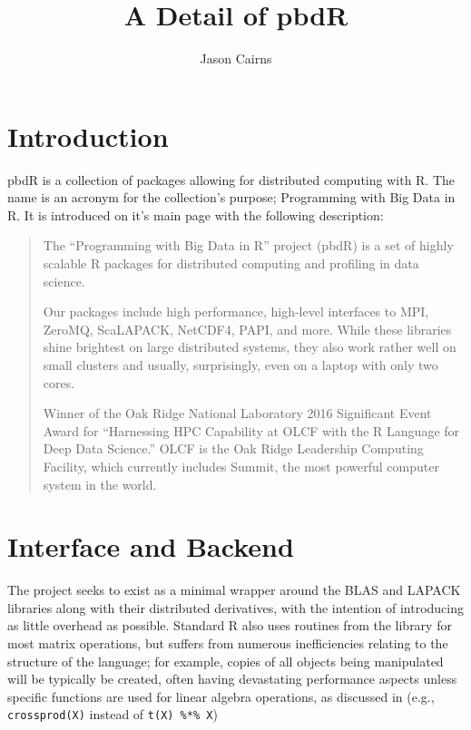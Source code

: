 \documentclass[a4paper,10pt]{article}
\begin{document}
\title{A Detail of pbdR}
\author{Jason Cairns}
  
\maketitle

\section{Introduction}
\label{sec:pbdr}

pbdR is a collection of packages allowing for distributed computing with
R\cite{pbdBASEpackage}. The name is an acronym for the collection's purpose;
Programming with Big Data in R. It is introduced on it's main page with the
following description:
\begin{quote}
	The ``Programming with Big Data in R'' project (pbdR) is a set of highly scalable
	R packages for distributed computing and profiling in data science.

	Our packages include high performance, high-level interfaces to MPI, ZeroMQ,
	ScaLAPACK, NetCDF4, PAPI, and more. While these libraries shine brightest on
	large distributed systems, they also work rather well on small clusters and
	usually, surprisingly, even on a laptop with only two cores.

	Winner of the Oak Ridge National Laboratory 2016 Significant Event Award for
	``Harnessing HPC Capability at OLCF with the R Language for Deep Data Science.''
	OLCF is the Oak Ridge Leadership Computing Facility, which currently includes
	Summit, the most powerful computer system in the world.\cite{pbdR2012}
\end{quote}

\section{Interface and Backend}

The project seeks to exist as a minimal wrapper around the BLAS and LAPACK
libraries along with their distributed derivatives, with the intention of
introducing as little overhead as possible.  Standard R also uses routines from
the library for most matrix operations, but suffers from numerous
inefficiencies relating to the structure of the language; for example, copies
of all objects being manipulated will be typically be created, often having
devastating performance aspects unless specific functions are used for linear
algebra operations, as discussed in \citeauthor{schmidt2017programming} (e.g.,
\texttt{crossprod(X)} instead of \texttt{t(X) \%*\% X})
\end{document}
